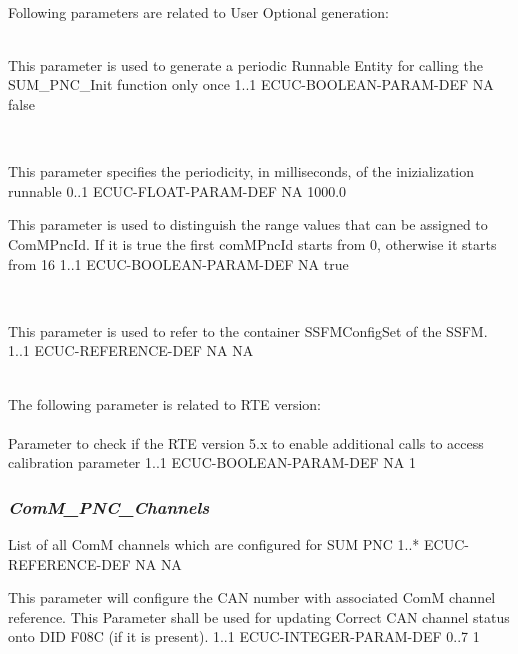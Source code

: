 \\
{  }

Following parameters are related to User Optional generation:
\\
\\

{This parameter is used to generate a periodic Runnable Entity for calling the SUM_PNC_Init function only once}
{1..1}
{ECUC-BOOLEAN-PARAM-DEF}
{NA}
{false}

\\

{This parameter specifies the periodicity, in milliseconds, of the inizialization runnable}
{0..1}
{ECUC-FLOAT-PARAM-DEF}
{NA}
{1000.0}


{This parameter is used to distinguish the range values that can be assigned to ComMPncId. If it is true the first comMPncId starts from 0, otherwise it starts from 16}
{1..1}
{ECUC-BOOLEAN-PARAM-DEF}
{NA}
{true}

\\
{}

{This parameter is used to refer to the container SSFMConfigSet of the SSFM.}
{1..1}
{ECUC-REFERENCE-DEF}
{NA}
{NA}

\\
The following parameter is related to RTE version:
\\
\\
{Parameter to check if the RTE version 5.x to enable additional calls to access calibration parameter}
{1..1}
{ECUC-BOOLEAN-PARAM-DEF}
{NA}
{1}

\subsubsection{\textit{ComM_PNC_Channels}}

{List of all ComM channels which are configured for SUM PNC}
{1..*}
{ECUC-REFERENCE-DEF}
{NA}
{NA}


{This parameter will configure the CAN number with associated ComM channel reference. This Parameter shall be used for updating Correct CAN channel status onto DID F08C (if it is present).}
{1..1}
{ECUC-INTEGER-PARAM-DEF}
{0..7}
{1}

